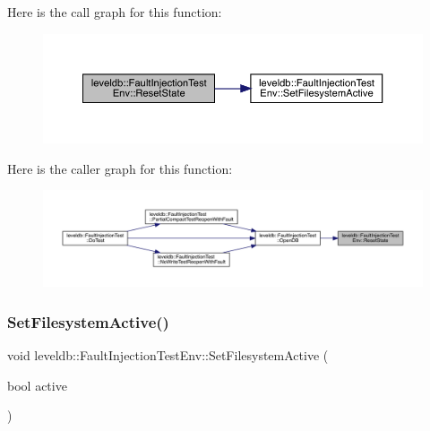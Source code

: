 Here is the call graph for this function\+:
\nopagebreak
\begin{figure}[H]
\begin{center}
\leavevmode
\includegraphics[width=350pt]{classleveldb_1_1_fault_injection_test_env_ae4f5f304ef1ae31a3da13efec88601f6_cgraph}
\end{center}
\end{figure}
Here is the caller graph for this function\+:
\nopagebreak
\begin{figure}[H]
\begin{center}
\leavevmode
\includegraphics[width=350pt]{classleveldb_1_1_fault_injection_test_env_ae4f5f304ef1ae31a3da13efec88601f6_icgraph}
\end{center}
\end{figure}
\mbox{\label{classleveldb_1_1_fault_injection_test_env_a0931f1fd0c96e617dd226cb2cdc44ad7}} 
\subsubsection{\texorpdfstring{SetFilesystemActive()}{SetFilesystemActive()}}
{\footnotesize\ttfamily void leveldb\+::\+Fault\+Injection\+Test\+Env\+::\+Set\+Filesystem\+Active (\begin{DoxyParamCaption}\item[{bool}]{active }\end{DoxyParamCaption})\hspace{0.3cm}{\ttfamily [inline]}}

